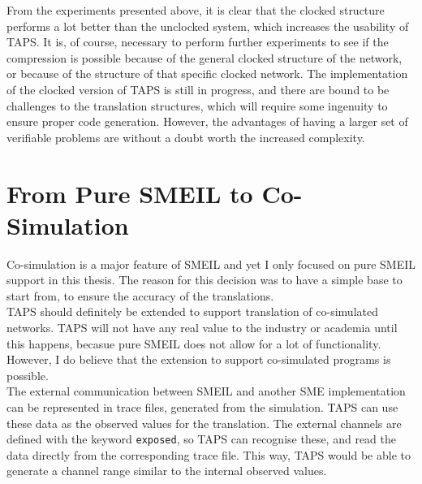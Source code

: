 From the experiments presented above, it is clear that the clocked structure performs a lot better than the unclocked system, which increases the usability of TAPS. It is, of course, necessary to perform further experiments to see if the compression is possible because of the general clocked structure of the network, or because of the structure of that specific clocked network.
The implementation of the clocked version of TAPS is still in progress, and there are bound to be challenges to the translation structures, which will require some ingenuity to ensure proper code generation. However, the advantages of having a larger set of verifiable problems are without a doubt worth the increased complexity.
\section{From Pure SMEIL to Co-Simulation}
Co-simulation is a major feature of SMEIL and yet I only focused on pure SMEIL support in this thesis. The reason for this decision was to have a simple base to start from, to ensure the accuracy of the translations.\\


TAPS should definitely be extended to support translation of co-simulated networks. TAPS will not have any real value to the industry or academia until this happens, becasue pure SMEIL does not allow for a lot of functionality. However, I do believe that the extension to support co-simulated programs is possible.\\

The external communication between SMEIL and another SME implementation can be represented in trace files, generated from the simulation. TAPS can use these data as the observed values for the translation. The external channels are defined with the keyword \texttt{exposed}, so TAPS can recognise these, and read the data directly from the corresponding trace file. This way, TAPS would be able to generate a channel range similar to the internal observed values.

